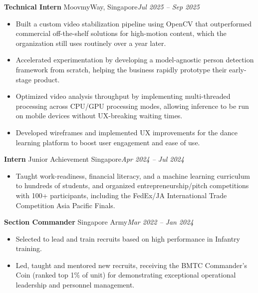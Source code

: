 \documentclass[11pt]{article}
\begin{document}
\vspace{4pt}
\noindent\textbf{Technical Intern} MoovmyWay, Singapore\hfill\textit{Jul 2025 -- Sep 2025}\par
\begin{itemize}
  \item Built a custom video stabilization pipeline using OpenCV that outperformed commercial off-the-shelf solutions for high-motion content, which the organization still uses routinely over a year later.
  \item Accelerated experimentation by developing a model-agnostic person detection framework from scratch, helping the business rapidly prototype their early-stage product.
  \item Optimized video analysis throughput by implementing multi-threaded processing across CPU/GPU processing modes, allowing inference to be run on mobile devices without UX-breaking waiting times.
  \item Developed wireframes and implemented UX improvements for the dance learning platform to boost user engagement and ease of use.
\end{itemize}

\vspace{4pt}
\noindent\textbf{Intern} Junior Achievement Singapore\hfill\textit{Apr 2024 -- Jul 2024}\par
\begin{itemize}
  \item Taught work-readiness, financial literacy, and a machine learning curriculum to hundreds of students, and organized entrepreneurship/pitch competitions with 100+ participants, including the FedEx/JA International Trade Competition Asia Pacific Finals.
\end{itemize}

\vspace{4pt}
\noindent\textbf{Section Commander} Singapore Army\hfill\textit{Mar 2022 -- Jan 2024}\par
\begin{itemize}
  \item Selected to lead and train recruits based on high performance in Infantry training.
  \item Led, taught and mentored new recruits, receiving the BMTC Commander's Coin (ranked top 1\% of unit) for demonstrating exceptional operational leadership and personnel management.
\end{itemize}
\end{document}
